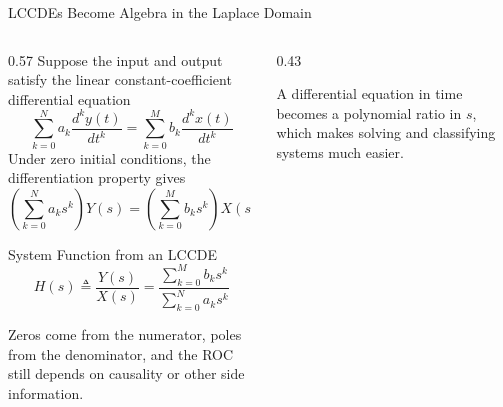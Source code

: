 \begin{frame}[t]{LCCDEs Become Algebra in the Laplace Domain}
  \small
  \begin{columns}[T]
    \begin{column}{0.57\textwidth}
      Suppose the input and output satisfy the linear constant-coefficient differential equation
      \[
        \sum_{k=0}^{N} a_k \frac{d^k y(t)}{dt^k}
        =
        \sum_{k=0}^{M} b_k \frac{d^k x(t)}{dt^k}
      \]
      Under zero initial conditions, the differentiation property gives
      \[
        \left(\sum_{k=0}^{N} a_k s^k\right)Y(s)
        =
        \left(\sum_{k=0}^{M} b_k s^k\right)X(s)
      \]

      \begin{conceptbox}{System Function from an LCCDE}
        \[
          H(s) \triangleq \frac{Y(s)}{X(s)}
          =
          \frac{\sum_{k=0}^{M} b_k s^k}{\sum_{k=0}^{N} a_k s^k}
        \]
      \end{conceptbox}

      Zeros come from the numerator, poles from the denominator, and the ROC still depends on causality or other side information.
    \end{column}
    \begin{column}{0.43\textwidth}
      \begin{center}
      \end{center}

      \vspace{0.15cm}
      A differential equation in time becomes a polynomial ratio in $s$, which makes solving and classifying systems much easier.
    \end{column}
  \end{columns}
\end{frame}


